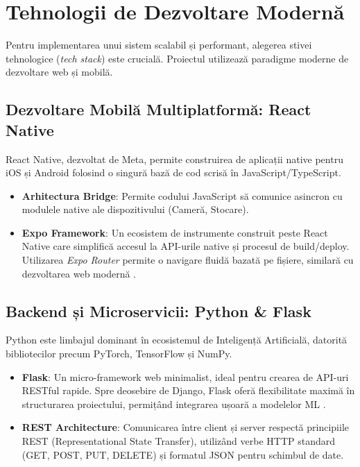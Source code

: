 \section{Tehnologii de Dezvoltare Modernă}
\label{sec:tehnologii_dezvoltare}

Pentru implementarea unui sistem scalabil și performant, alegerea stivei tehnologice (\textit{tech stack}) este crucială. Proiectul utilizează paradigme moderne de dezvoltare web și mobilă.

\subsection{Dezvoltare Mobilă Multiplatformă: React Native}
React Native, dezvoltat de Meta, permite construirea de aplicații native pentru iOS și Android folosind o singură bază de cod scrisă în JavaScript/TypeScript.
\begin{itemize}
    \item \textbf{Arhitectura Bridge}: Permite codului JavaScript să comunice asincron cu modulele native ale dispozitivului (Cameră, Stocare).
    \item \textbf{Expo Framework}: Un ecosistem de instrumente construit peste React Native care simplifică accesul la API-urile native și procesul de build/deploy. Utilizarea \textit{Expo Router} permite o navigare fluidă bazată pe fișiere, similară cu dezvoltarea web modernă \cite{reactnative_doc}.
\end{itemize}

\subsection{Backend și Microservicii: Python & Flask}
Python este limbajul dominant în ecosistemul de Inteligență Artificială, datorită bibliotecilor precum PyTorch, TensorFlow și NumPy.
\begin{itemize}
    \item \textbf{Flask}: Un micro-framework web minimalist, ideal pentru crearea de API-uri RESTful rapide. Spre deosebire de Django, Flask oferă flexibilitate maximă în structurarea proiectului, permițând integrarea ușoară a modelelor ML \cite{flask_doc}.
    \item \textbf{REST Architecture}: Comunicarea între client și server respectă principiile REST (Representational State Transfer), utilizând verbe HTTP standard (GET, POST, PUT, DELETE) și formatul JSON pentru schimbul de date.
\end{itemize}

